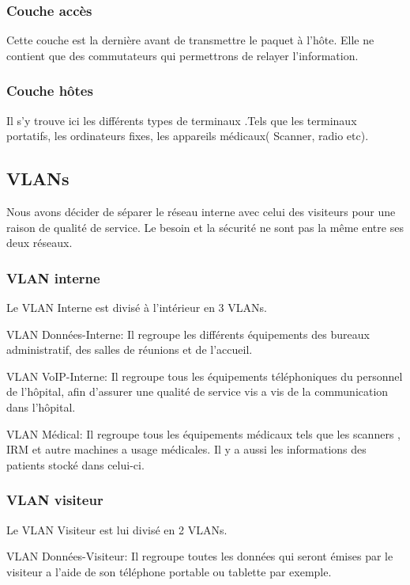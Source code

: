\subsubsection{Couche accès}
Cette couche est la dernière avant de transmettre le paquet à l'hôte.
Elle ne contient que des commutateurs qui permettrons de relayer l'information.

\subsubsection{Couche hôtes}
Il s'y trouve ici les différents types de terminaux .Tels que les terminaux portatifs, les ordinateurs fixes, les appareils médicaux( Scanner, radio etc).

%
    \cleardoublepage
%
%
\subsection{VLANs}

Nous avons décider de séparer le réseau interne avec celui des visiteurs pour une raison de qualité de service.
Le besoin et la sécurité ne sont pas la même entre ses deux réseaux.

%
%
\subsubsection{VLAN interne}

Le VLAN Interne est divisé à l'intérieur en 3 VLANs.

VLAN Données-Interne:
Il regroupe les différents équipements des bureaux administratif, des salles de réunions et de l'accueil.

VLAN VoIP-Interne:
Il regroupe tous les équipements téléphoniques du personnel de l'hôpital, afin d'assurer une qualité de service vis a vis de la communication dans l'hôpital.

VLAN Médical:
Il regroupe tous les équipements médicaux tels que les scanners , IRM et autre machines a usage médicales.
Il y a aussi les informations des patients stocké dans celui-ci.

%
%
\subsubsection{VLAN visiteur}

Le VLAN Visiteur est lui divisé en 2 VLANs.

VLAN Données-Visiteur:
Il regroupe toutes les données qui seront émises par le visiteur a l'aide de son téléphone portable ou tablette par exemple.

